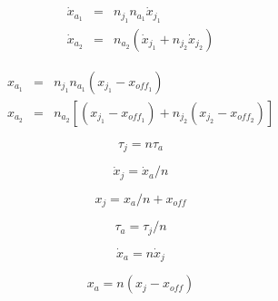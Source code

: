 \documentclass{article}
\begin{document}
\begin{eqnarray*} \dot{x}_{a_1} & = & n_{j_1} n_{a_1} \dot{x}_{j_1} \\ \dot{x}_{a_2} & = & n_{a_2} (\dot{x}_{j_1} + n_{j_2} \dot{x}_{j_2}) \end{eqnarray*}
\pagebreak

\begin{eqnarray*} x_{a_1} & = & n_{j_1} n_{a_1} (x_{j_1} - x_{off_1}) \\ x_{a_2} & = & n_{a_2} \left[(x_{j_1} - x_{off_1}) + n_{j_2} (x_{j_2} - x_{off_2})\right] \end{eqnarray*}
\pagebreak

\[ \tau_j = n \tau_a \]
\pagebreak

\[ \dot{x}_j = \dot{x}_a / n \]
\pagebreak

\[ x_j = x_a / n + x_{off} \]
\pagebreak

\[ \tau_a = \tau_j / n\]
\pagebreak

\[ \dot{x}_a = n \dot{x}_j \]
\pagebreak

\[ x_a = n (x_j - x_{off}) \]
\pagebreak
\end{document}
